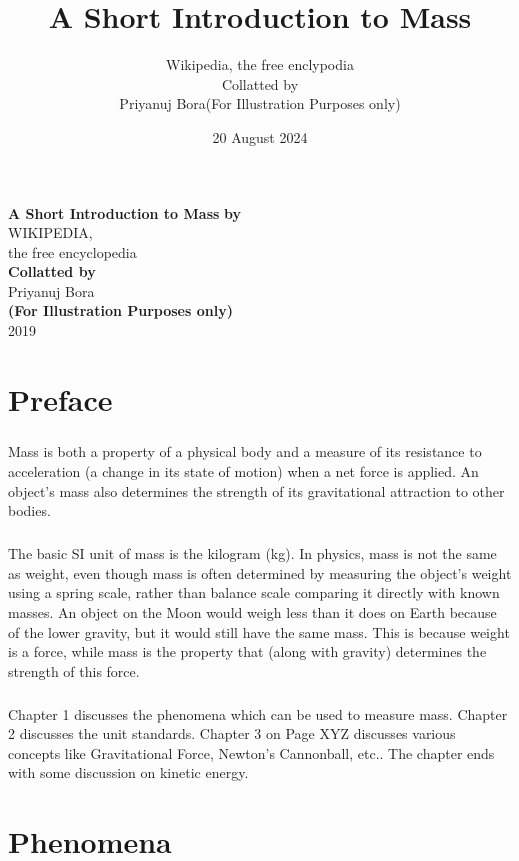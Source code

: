 \documentclass{book}
\title{A Short Introduction to Mass}
\author{Wikipedia, the free enclypodia\\Collatted by\\Priyanuj Bora(For Illustration Purposes only)}
\date{20 August 2024}
\begin{document}
	{\Huge\textbf{A Short Introduction to Mass}} \LARGE\textbf{by}\\
	WIKIPEDIA,\\
	the free encyclopedia\\
	\textbf{Collatted by}\\
	Priyanuj Bora\\
	\textbf{(For Illustration Purposes only)}\\
	2019\\
	
	\chapter*{Preface}
	\paragraph{}
	Mass is both a property of a physical body and a measure of its resistance to acceleration (a change in its state of motion) when a net force is applied. An object's mass also determines the strength of its gravitational attraction to other bodies.
	
	\paragraph{}
	\normalsize
	The basic SI unit of mass is the kilogram (kg). In physics, mass is not the same as weight, even though
	mass is often determined by measuring the object’s weight using a spring scale, rather than balance scale
	comparing it directly with known masses. An object on the Moon would weigh less than it does on Earth
	because of the lower gravity, but it would still have the same mass. This is because weight is a force,
	while mass is the property that (along with gravity) determines the strength of this force.
	
	\paragraph{}
	Chapter 1 discusses the phenomena which can be used to measure mass. Chapter 2 discusses the
	unit standards. Chapter 3 on Page XYZ discusses various concepts like Gravitational Force, Newton’s
	Cannonball, etc.. The chapter ends with some discussion on kinetic energy.
	
	\tableofcontents
	
	\chapter{Phenomena}
	\setcounter{page}{1}
\end{document}
